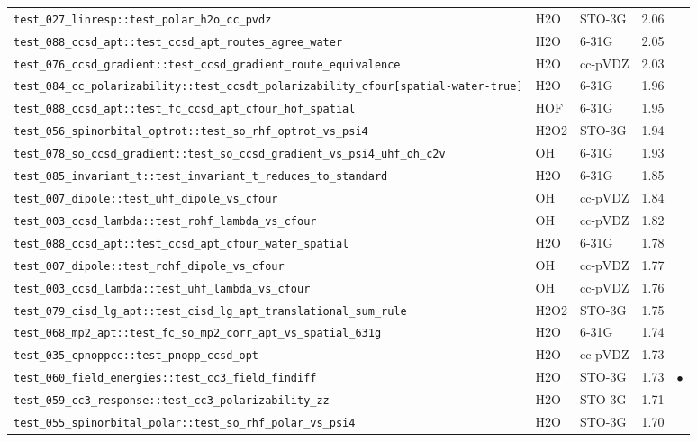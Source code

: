 \documentclass[10pt]{article}
\begin{document}
\begin{longtable}{l l l r c}
\texttt{test\_027\_linresp::test\_polar\_h2o\_cc\_pvdz} & H2O & STO-3G & 2.06 &  \\
\texttt{test\_088\_ccsd\_apt::test\_ccsd\_apt\_routes\_agree\_water} & H2O & 6-31G & 2.05 &  \\
\texttt{test\_076\_ccsd\_gradient::test\_ccsd\_gradient\_route\_equivalence} & H2O & cc-pVDZ & 2.03 &  \\
\texttt{test\_084\_cc\_polarizability::test\_ccsdt\_polarizability\_cfour[spatial-water-true]} & H2O & 6-31G & 1.96 &  \\
\texttt{test\_088\_ccsd\_apt::test\_fc\_ccsd\_apt\_cfour\_hof\_spatial} & HOF & 6-31G & 1.95 &  \\
\texttt{test\_056\_spinorbital\_optrot::test\_so\_rhf\_optrot\_vs\_psi4} & H2O2 & STO-3G & 1.94 &  \\
\texttt{test\_078\_so\_ccsd\_gradient::test\_so\_ccsd\_gradient\_vs\_psi4\_uhf\_oh\_c2v} & OH & 6-31G & 1.93 &  \\
\texttt{test\_085\_invariant\_t::test\_invariant\_t\_reduces\_to\_standard} & H2O & 6-31G & 1.85 &  \\
\texttt{test\_007\_dipole::test\_uhf\_dipole\_vs\_cfour} & OH & cc-pVDZ & 1.84 &  \\
\texttt{test\_003\_ccsd\_lambda::test\_rohf\_lambda\_vs\_cfour} & OH & cc-pVDZ & 1.82 &  \\
\texttt{test\_088\_ccsd\_apt::test\_ccsd\_apt\_cfour\_water\_spatial} & H2O & 6-31G & 1.78 &  \\
\texttt{test\_007\_dipole::test\_rohf\_dipole\_vs\_cfour} & OH & cc-pVDZ & 1.77 &  \\
\texttt{test\_003\_ccsd\_lambda::test\_uhf\_lambda\_vs\_cfour} & OH & cc-pVDZ & 1.76 &  \\
\texttt{test\_079\_cisd\_lg\_apt::test\_cisd\_lg\_apt\_translational\_sum\_rule} & H2O2 & STO-3G & 1.75 &  \\
\texttt{test\_068\_mp2\_apt::test\_fc\_so\_mp2\_corr\_apt\_vs\_spatial\_631g} & H2O & 6-31G & 1.74 &  \\
\texttt{test\_035\_cpnoppcc::test\_pnopp\_ccsd\_opt} & H2O & cc-pVDZ & 1.73 &  \\
\texttt{test\_060\_field\_energies::test\_cc3\_field\_findiff} & H2O & STO-3G & 1.73 & $\bullet$ \\
\texttt{test\_059\_cc3\_response::test\_cc3\_polarizability\_zz} & H2O & STO-3G & 1.71 &  \\
\texttt{test\_055\_spinorbital\_polar::test\_so\_rhf\_polar\_vs\_psi4} & H2O & STO-3G & 1.70 &  \\

\end{longtable}
\end{document}
